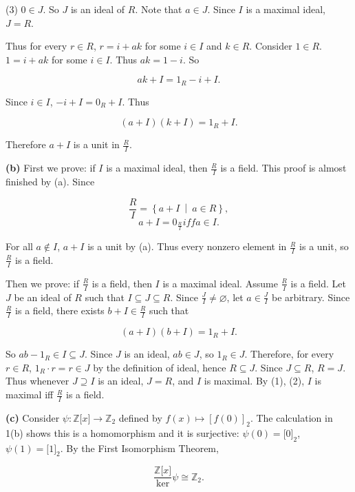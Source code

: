 (3) \(0 \in J\). So \(J\) is an ideal of \(R\). Note that \(a \in J\). Since \(I\) is a maximal ideal, \(J = R\).

Thus for every \(r \in R\), \(r = i + ak\) for some \(i \in I\) and \(k \in R\). Consider \(1 \in R\). \(1 = i + ak\) for some \(i \in I\). Thus \(ak = 1 - i\). So

\[ak + I = 1_{R} - i + I.\]

Since \(i \in I\), \(- i + I = 0_{R} + I\). Thus

\[\left( {a + I} \right)\left( {k + I} \right) = 1_{R} + I.\]

Therefore \(a + I\) is a unit in \(\frac{R}{I}\).

\textbf{(b)} First we prove: if \(I\) is a maximal ideal, then \(\frac{R}{I}\) is a field. This proof is almost finished by (a). Since

\[\frac{R}{I} = \left\{ a + I\  \middle| \ a \in R \right\},\]\[a + I = 0_{\frac{R}{I}}iffa \in I.\]

For all \(a \notin I\), \(a + I\) is a unit by (a). Thus every nonzero element in \(\frac{R}{I}\) is a unit, so \(\frac{R}{I}\) is a field.

Then we prove: if \(\frac{R}{I}\) is a field, then \(I\) is a maximal ideal. Assume \(\frac{R}{I}\) is a field. Let \(J\) be an ideal of \(R\) such that \(I \subseteq J \subseteq R\). Since \(\frac{J}{I} \neq \varnothing\), let \(a \in \frac{J}{I}\) be arbitrary. Since \(\frac{R}{I}\) is a field, there exists \(b + I \in \frac{R}{I}\) such that

\[\left( {a + I} \right)\left( {b + I} \right) = 1_{R} + I.\]

So \(ab - 1_{R} \in I \subseteq J\). Since \(J\) is an ideal, \(ab \in J\), so \(1_{R} \in J\). Therefore, for every \(r \in R\), \(1_{R} \cdot r = r \in J\) by the definition of ideal, hence \(R \subseteq J\). Since \(J \subseteq R\), \(R = J\). Thus whenever \(J \supseteq I\) is an ideal, \(J = R\), and \(I\) is maximal. By (1), (2), \(I\) is maximal iff \(\frac{R}{I}\) is a field.

\textbf{(c)} Consider \(\psi:\mathbb{Z}\lbrack x\rbrack\rightarrow\mathbb{Z}_{2}\) defined by \(f(x)\mapsto\left\lbrack {f(0)} \right\rbrack_{2}\). The calculation in 1(b) shows this is a homomorphism and it is surjective: \(\psi(0) = \lbrack 0\rbrack_{2}\), \(\psi(1) = \lbrack 1\rbrack_{2}\). By the First Isomorphism Theorem,

\[\frac{\mathbb{Z}\lbrack x\rbrack}{\ker}\psi \cong \mathbb{Z}_{2}.\]

